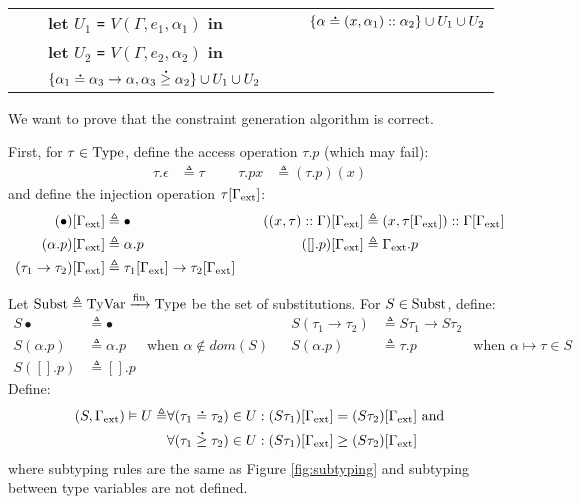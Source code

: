 \documentclass{article}
\begin{document}
\begin{tabular}{rclrcl}
                                 &              & \textbf{let} $U_1$ \texttt{=} $V(\Gamma,e_1,\alpha_1)$ \textbf{in}                   &                                            &              & $\{\alpha\overset{\,_{\mbox{\Large .}}}{=}(x,\alpha_1)::\alpha_2\}\cup U_1\cup U_2$                          \\
                                 &              & \textbf{let} $U_2$ \texttt{=} $V(\Gamma,e_2,\alpha_2)$ \textbf{in}                                                                                                                                                                     \\
                                 &              & $\{\alpha_1\overset{\,_{\mbox{\Large .}}}{=}\alpha_3\rightarrow\alpha,\alpha_3\overset{\,_{\mbox{\Large .}}}{\ge}\alpha_2\}\cup U_1\cup U_2$
\end{tabular}

\vphantom{}

We want to prove that the constraint generation algorithm is correct.

First, for $\tau\in\text{Type}$, define the access operation $\tau.p$ (which may fail):
\begin{align*}
  \tau.\epsilon & \triangleq\tau &  &  & \tau.px & \triangleq(\tau.p)(x)
\end{align*}
and define the injection operation $\tau[\Gamma_{\text{ext}}]$:
\begin{align*}
  (\bullet)[\Gamma_{\text{ext}}]                 & \triangleq\bullet                                       &  &  & ((x,\tau)::\Gamma)[\Gamma_{\text{ext}}] & \triangleq(x,\tau[\Gamma_{\text{ext}}])::\Gamma[\Gamma_{\text{ext}}] \\
  (\alpha.p)[\Gamma_{\text{ext}}]                & \triangleq\alpha.p                                      &  &  & ([].p)[\Gamma_{\text{ext}}]                & \triangleq\Gamma_{\text{ext}}.p                               \\
  (\tau_1\rightarrow\tau_2)[\Gamma_{\text{ext}}] & \triangleq\tau_1[\Gamma_{\text{ext}}]\rightarrow\tau_2[\Gamma_{\text{ext}}]
\end{align*}

Let $\text{Subst}\triangleq{\text{TyVar}}\xrightarrow{\text{fin}}{\text{Type}}$ be the set of substitutions.
For $S\in\text{Subst}$, define:
\begin{align*}
  S\bullet    & \triangleq\bullet  &                                  &  & S(\tau_1\rightarrow\tau_2) & \triangleq S\tau_1\rightarrow S\tau_2                                      \\
  S(\alpha.p) & \triangleq\alpha.p & \text{when }\alpha\not\in dom(S) &  & S(\alpha.p)                & \triangleq \tau.p                     & \text{when }\alpha\mapsto\tau\in S \\
  S([].p)     & \triangleq [].p
\end{align*}
Define:
\begin{align*}
  (S,\Gamma_{\text{ext}})\vDash U\triangleq & \forall(\tau_1\overset{\,_{\mbox{\Large .}}}{=}\tau_2)\in U:(S\tau_1)[\Gamma_{\text{ext}}]= (S\tau_2)[\Gamma_{\text{ext}}]\text{ and} \\
                                  & \forall(\tau_1\overset{\,_{\mbox{\Large .}}}{\ge}\tau_2)\in U:(S\tau_1)[\Gamma_{\text{ext}}]\ge(S\tau_2)[\Gamma_{\text{ext}}]
\end{align*}
where subtyping rules are the same as Figure \ref{fig:subtyping} and subtyping between type variables are not defined.
\end{document}
